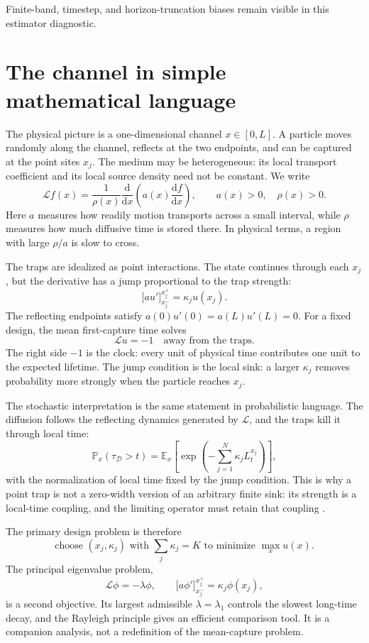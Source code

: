 \documentclass[10pt]{article}
\newcommand{\E}{\mathbb E}
\newcommand{\Prob}{\mathbb P}
\begin{document}
Finite-band, timestep, and horizon-truncation biases remain visible in this estimator diagnostic.

\section{The channel in simple mathematical language}

The physical picture is a one-dimensional channel $x\in[0,L]$. A particle moves randomly along the channel, reflects at the two endpoints, and can be captured at the point sites $x_j$. The medium may be heterogeneous: its local transport coefficient and its local source density need not be constant. We write
\[
\mathcal L f(x)=\frac{1}{\rho(x)}\frac{\mathrm d}{\mathrm dx}
\left(a(x)\frac{\mathrm df}{\mathrm dx}\right),
\qquad a(x)>0,\quad \rho(x)>0.
\]
Here $a$ measures how readily motion transports across a small interval, while $\rho$ measures how much diffusive time is stored there. In physical terms, a region with large $\rho/a$ is slow to cross.

The traps are idealized as point interactions. The state continues through each $x_j$, but the derivative has a jump proportional to the trap strength:
\[
\bigl[a u'\bigr]_{x_j^-}^{x_j^+}=\kappa_j u(x_j).
\]
The reflecting endpoints satisfy $a(0)u'(0)=a(L)u'(L)=0$. For a fixed design, the mean first-capture time solves
\[
\mathcal L u=-1\quad\text{away from the traps}.
\]
The right side $-1$ is the clock: every unit of physical time contributes one unit to the expected lifetime. The jump condition is the local sink: a larger $\kappa_j$ removes probability more strongly when the particle reaches $x_j$.

The stochastic interpretation is the same statement in probabilistic language. The diffusion follows the reflecting dynamics generated by $\mathcal L$, and the traps kill it through local time:
\[
\Prob_x(\tau_{\mathcal D}>t)
=\E_x\!\left[\exp\left(-\sum_{j=1}^N\kappa_j L_t^{x_j}\right)\right],
\]
with the normalization of local time fixed by the jump condition. This is why a point trap is not a zero-width version of an arbitrary finite sink: its strength is a local-time coupling, and the limiting operator must retain that coupling \cite{Karatzas1991,Fukushima2011,Bressloff2022}.

The primary design problem is therefore
\[
\boxed{\;\text{choose }(x_j,\kappa_j)\text{ with }\sum_j\kappa_j=K
\text{ to minimize }\max_x u(x).\;}
\]
The principal eigenvalue problem,
\[
\mathcal L\phi=-\lambda\phi,
\qquad
\bigl[a\phi'\bigr]_{x_j^-}^{x_j^+}=\kappa_j\phi(x_j),
\]
is a second objective. Its largest admissible $\lambda=\lambda_1$ controls the slowest long-time decay, and the Rayleigh principle gives an efficient comparison tool. It is a companion analysis, not a redefinition of the mean-capture problem.
\end{document}
